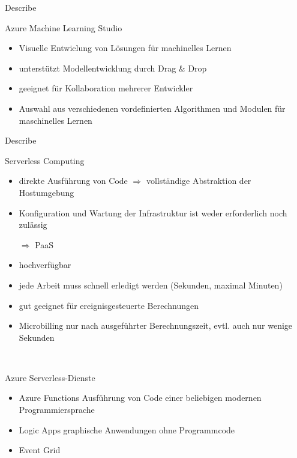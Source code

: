 \documentclass{scrartcl}
\newenvironment{flashcard}[2][]{%
    #1
    \vfill
    \centerline{\Large{#2}}
    \vfill
\newpage
}
{\newpage}
\begin{document}
    \begin{flashcard}[Describe]{Azure Machine Learning Studio}
        \begin{itemize}
            \item Visuelle Entwiclung von Lösungen für machinelles Lernen
            \item unterstützt Modellentwicklung durch Drag \& Drop
            \item geeignet für Kollaboration mehrerer Entwickler
            \item Auswahl aus verschiedenen vordefinierten Algorithmen und Modulen für maschinelles Lernen
        \end{itemize}
    \end{flashcard}

    \begin{flashcard}[Describe]{Serverless Computing}
        \begin{itemize}
            \item direkte Ausführung von Code\newline
            $\Rightarrow$ vollständige Abstraktion der Hostumgebung
            \item Konfiguration und Wartung der Infrastruktur ist weder erforderlich noch zulässig
            \item[$\Rightarrow$] PaaS
            \item hochverfügbar
            \item jede Arbeit muss schnell erledigt werden (Sekunden, maximal Minuten)
            \item gut geeignet für ereignisgesteuerte Berechnungen
            \item Microbilling nur nach ausgeführter Berechnungszeit, evtl. auch nur wenige Sekunden
        \end{itemize}

    \end{flashcard}

    \begin{flashcard}[\ ]{Azure Serverless-Dienste}
        \begin{itemize}
            \item Azure Functions\newline
            Ausführung von Code einer beliebigen modernen Programmiersprache
            \item Logic Apps\newline
            graphische Anwendungen ohne Programmcode
            \item Event Grid\newline
        \end{itemize}

    \end{flashcard}
\end{document}
